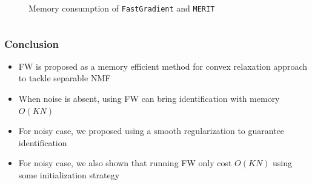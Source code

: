 \documentclass[10pt,xcolor={usenames,dvipsnames,table}]{beamer}
\begin{document}
\begin{frame}
\begin{columns}
\begin{column}{0.55\textwidth}
\begin{figure}[t]
    \centering
    \vspace{-0.6cm}
    \captionsetup{justification=centering,margin=0.2cm,font=scriptsize}
    \caption*{Memory consumption of \texttt{FastGradient} and \texttt{MERIT}} 
\end{figure}
        \end{column}
    \end{columns}
\end{frame}

\begin{frame}
    \frametitle{Conclusion}
    \begin{itemize}
        \item FW is proposed as a memory efficient method for convex relaxation approach to tackle separable NMF
        \item When noise is absent, using FW can bring identification with memory $O(KN)$
        \item For noisy case, we proposed using a smooth regularization to guarantee identification
        \item For noisy case, we also shown that running FW only cost $O(KN)$ using some initialization strategy
    \end{itemize}
\end{frame}
\end{document}
